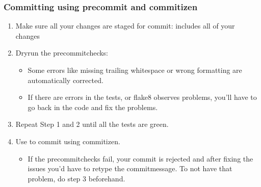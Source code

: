 \documentclass[a4paper,10pt,english]{sphinxmanual}
\begin{document}
\subsubsection{Committing using pre\sphinxhyphen{}commit and commitizen}
\label{\detokenize{CONTRIBUTING:committing-using-pre-commit-and-commitizen}}\begin{enumerate}
%
\item {}
\sphinxAtStartPar
Make sure all your changes are staged for commit:  includes all of your changes

\item {}
\sphinxAtStartPar
Dry\sphinxhyphen{}run the pre\sphinxhyphen{}commit\sphinxhyphen{}checks: 
\begin{itemize}
\item {}
\sphinxAtStartPar
Some errors like missing trailing whitespace or wrong formatting are automatically corrected.

\item {}
\sphinxAtStartPar
If there are errors in the tests, or flake8 observes problems, you’ll have to go back in the code and fix the problems.

\end{itemize}

\item {}
\sphinxAtStartPar
Repeat Step 1 and 2 until all the tests are green.

\item {}
\sphinxAtStartPar
Use  to commit using commitizen.
\begin{itemize}
\item {}
\sphinxAtStartPar
If the pre\sphinxhyphen{}commit\sphinxhyphen{}checks fail, your commit is rejected and after fixing the issues you’d have to retype the commit\sphinxhyphen{}message. To not have that problem, do step 3 beforehand.

\end{itemize}

\end{enumerate}
\end{document}
